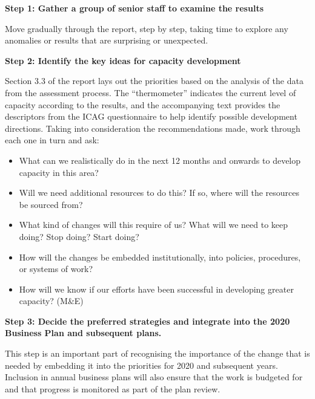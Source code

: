 \documentclass[
  10pt,
]{report}
\providecommand{\tightlist}{%
  \setlength{\itemsep}{0pt}\setlength{\parskip}{0pt}}
\begin{document}
\textbf{Step 1: Gather a group of senior staff to examine the results}

Move gradually through the report, step by step, taking time to explore
any anomalies or results that are surprising or unexpected.

\textbf{Step 2: Identify the key ideas for capacity development}

Section 3.3 of the report lays out the priorities based on the analysis
of the data from the assessment process. The ``thermometer'' indicates
the current level of capacity according to the results, and the
accompanying text provides the descriptors from the ICAG questionnaire
to help identify possible development directions. Taking into
consideration the recommendations made, work through each one in turn
and ask:

\begin{itemize}
\tightlist
\item
  What can we realistically do in the next 12 months and onwards to
  develop capacity in this area?
\item
  Will we need additional resources to do this? If so, where will the
  resources be sourced from?
\item
  What kind of changes will this require of us? What will we need to
  keep doing? Stop doing? Start doing?
\item
  How will the changes be embedded institutionally, into policies,
  procedures, or systems of work?
\item
  How will we know if our efforts have been successful in developing
  greater capacity? (M\&E)
\end{itemize}

\textbf{Step 3: Decide the preferred strategies and integrate into the
2020 Business Plan and subsequent plans.}

This step is an important part of recognising the importance of the
change that is needed by embedding it into the priorities for 2020 and
subsequent years. Inclusion in annual business plans will also ensure
that the work is budgeted for and that progress is monitored as part of
the plan review.
\end{document}
